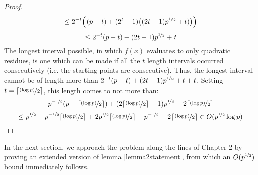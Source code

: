 \documentclass{report}
\begin{document}
\begin{proof}
\[ \leq 2^{-t}\Big((p-t)+(2^{t}-1)\big((2t-1)p^{\nicefrac{1}{2}}+t)\big)\Big) \]
\[ \leq 2^{-t}(p-t)+ (2t-1)p^{\nicefrac{1}{2}}+t \]
The longest interval possible, in which $f(x)$ evaluates to only quadratic residues, is one which can be made if all the $t$ length intervals occurred consecutively (i.e. the starting points are consecutive). Thus, the longest interval cannot be of length more than $2^{-t}(p-t)+ (2t-1) p^ {\nicefrac {1}{2}} +t+t$. Setting $t=\lceil\nicefrac{(\log p)}{2}\rceil$, this length comes to not more than:
\[p^{-\nicefrac{1}{2}}(p- \lceil\nicefrac{(\log p)}{2}\rceil)+ (2\lceil\nicefrac{(\log p)}{2}\rceil-1) p^ {\nicefrac {1}{2}} +2\lceil\nicefrac{(\log p)}{2}\rceil\]
\[ \leq p^ {\nicefrac {1}{2}} - p^ {-\nicefrac {1}{2}} \lceil\nicefrac{(\log p)}{2}\rceil + 2p^ {\nicefrac {1}{2}} \lceil\nicefrac{(\log p)}{2}\rceil - p^ {-\nicefrac {1}{2}} + 2\lceil\nicefrac{(\log p)}{2}\rceil \in O(p^{\nicefrac{1}{2}}\log p) \]
\end{proof}
In the next section, we approach the problem along the lines of Chapter 2 by proving an extended version of lemma \ref{lemma2statement}, from which an $O(p^{ \nicefrac {1}{2}})$ bound immediately follows.
%
%
\end{document}

